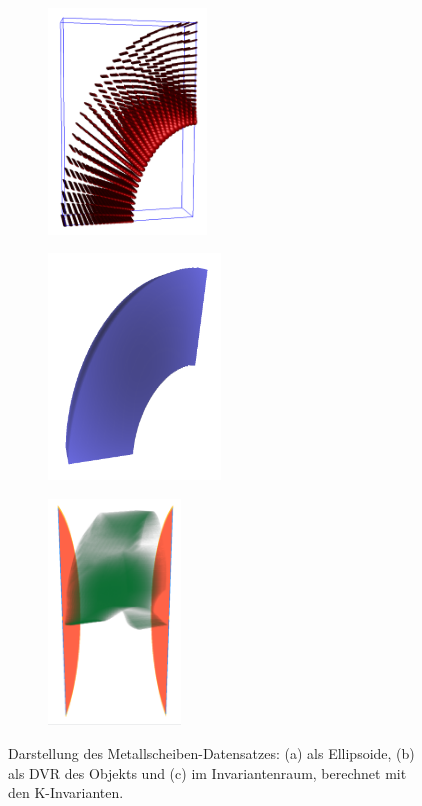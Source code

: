 \documentclass[a4paper,fontsize=12pt,toc=bib,halfparskip]{scrartcl}
\begin{document}
\begin{figure}
	\begin{subfigure}{0.3\textwidth}
		\centering
		\includegraphics[height=6cm]{pictures/results/MetalDiskStrain_Ellipsoids.png}
		\subcaption{}
		\label{MetalDiskStrainEllipsoids}
	\end{subfigure}
	\hspace*{\fill}
	\begin{subfigure}{0.3\textwidth}
		\centering
		\includegraphics[height=6cm]{pictures/results/MetalDiskStrain_Object.png}
		\subcaption{}
		\label{MetalDiskStrainObject}
	\end{subfigure}
	\hspace*{\fill}
	\begin{subfigure}{0.3\textwidth}
		\centering
		\includegraphics[height=6cm]{pictures/results/MetalDiskStrain_InvariantSpace.png}
		\subcaption{}
		\label{MetalDiskStrainInvariantSpace}
	\end{subfigure}
	\caption{Darstellung des Metallscheiben-Datensatzes: (a) als Ellipsoide, (b) als DVR des Objekts und (c) im Invariantenraum, berechnet mit den K-Invarianten.}
	\label{MetalDiskStrain}
\end{figure}
\end{document}
